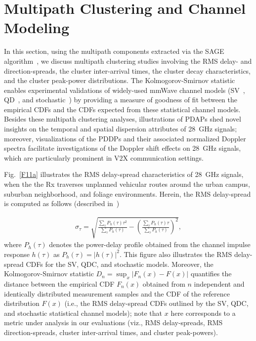\documentclass[12pt, draftcls, onecolumn]{IEEEtran}
\begin{document}
{%
\section{Multipath Clustering and Channel Modeling}\label{S5}
In this section, using the multipath components extracted via the SAGE algorithm~\cite{SAGE}, we discuss multipath clustering studies involving the RMS delay- and direction-spreads, the cluster inter-arrival times, the cluster decay characteristics, and the cluster peak-power distributions. The Kolmogorov-Smirnov statistic enables experimental validations of widely-used mmWave channel models (SV~\cite{Indoor60G}, QD~\cite{QDC_NIST}, and stochastic~\cite{Indoor60G}) by providing a measure of goodness of fit between the empirical CDFs and the CDFs expected from these statistical channel models. Besides these multipath clustering analyses, illustrations of PDAPs shed novel insights on the temporal and spatial dispersion attributes of \SI{28}{\giga\hertz} signals; moreover, visualizations of the PDDPs and their associated normalized Doppler spectra facilitate investigations of the Doppler shift effects on \SI{28}{\giga\hertz} signals, which are particularly prominent in V$2$X communication settings.

Fig.~\ref{F11a} illustrates the RMS delay-spread characteristics of \SI{28}{\giga\hertz} signals, when the the Rx traverses unplanned vehicular routes around the urban campus, suburban neighborhood, and foliage environments. Herein, the RMS delay-spread is computed as follows (described in~\cite{Indoor60G})

\begin{align}\label{RMS_DS}
    \sigma_{\tau} = \sqrt{\frac{\sum_{\tau}P_{h}(\tau)\tau^{2}}{\sum_{\tau}P_{h}(\tau)} - \left(\frac{\sum_{\tau}P_{h}(\tau)\tau}{\sum_{\tau}P_{h}(\tau)}\right)^{2}},
\end{align}
where $P_{h}(\tau)$ denotes the power-delay profile obtained from the channel impulse response $h(\tau)$ as $P_{h}(\tau){=}|h(\tau)|^{2}$. This figure also illustrates the RMS delay-spread CDFs for the SV, QDC, and stochastic models. Moreover, the Kolmogorov-Smirnov statistic $D_{n}{=}\sup_{x}|F_{n}(x){-}F(x)|$ quantifies the distance between the empirical CDF $F_{n}(x)$ obtained from $n$ independent and identically distributed measurement samples and the CDF of the reference distribution $F(x)$ (i.e., the RMS delay-spread CDFs outlined by the SV, QDC, and stochastic statistical channel models); note that $x$ here corresponds to a metric under analysis in our evaluations (viz., RMS delay-spreads, RMS direction-spreads, cluster inter-arrival times, and cluster peak-powers).

}
\end{document}
